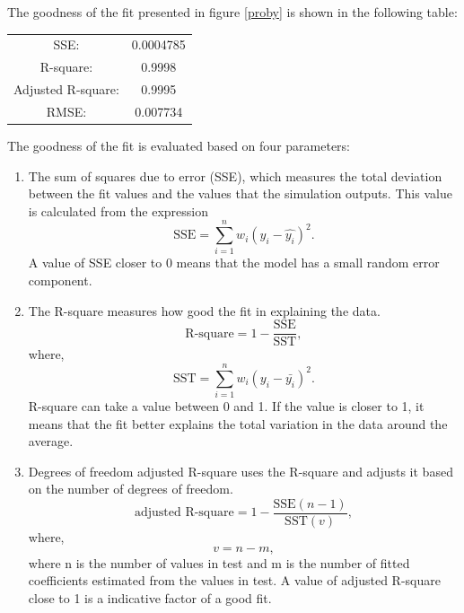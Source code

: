 The goodness of the fit presented in figure \ref{proby} is shown in the following table:
\begin{table}[H]
\centering
\label{tab:goodnessfitprob0}
    \begin{tabular}{c|c}
        SSE:                &0.0004785\\
        R-square:           &0.9998\\
        Adjusted R-square:  &0.9995\\
        RMSE:               &0.007734
  \end{tabular}
\end{table}

The goodness of the fit is evaluated based on four parameters:
\begin{enumerate}
  \item The sum of squares due to error (SSE), which measures the total deviation between the fit values and the values that the simulation outputs. This value is calculated from the expression
      \begin{equation}\label{}
        \textrm{SSE} = \sum_{i=1}^{n} w_i(y_{i}-\hat{y_{i}})^2.
        \nonumber
      \end{equation}
      A value of SSE closer to 0 means that the model has a small random error component.

  \item The R-square measures how good the fit in explaining the data.
    \begin{equation}\label{}
    \textrm{R-square} = 1-\frac{\textrm{SSE}}{\textrm{SST}},
    \nonumber
    \end{equation}
    where,
    \begin{equation}\label{}
    \textrm{SST} = \sum_{i=1}^{n} w_i (y_i - \bar{y_i})^2.
      \nonumber
    \end{equation}
    R-square can take a value between 0 and 1. If the value is closer to 1, it means that the fit better explains the total variation in the data around the average.

  \item Degrees of freedom adjusted R-square uses the R-square and adjusts it based on the number of degrees of freedom.
    \begin{equation}\label{}
      \textrm{adjusted R-square} = 1 - \frac{\textrm{SSE}(n-1)}{\textrm{SST}(v)},
      \nonumber
    \end{equation}
    where,
    \begin{equation}\label{}
      v = n - m,
      \nonumber
    \end{equation}
    where n is the number of values in test and m is the number of fitted coefficients estimated from the values in test. A value of adjusted R-square close to 1 is a indicative factor of a good fit.


\end{enumerate}
